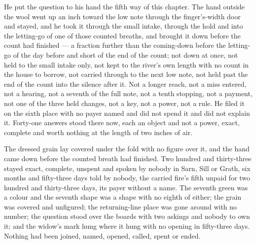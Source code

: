He put the question to his hand the fifth way of this chapter. The hand outside the wool went up an inch toward the low note through the finger's-width door and stayed, and he took it through the small intake, through the hold and into the letting-go of one of those counted breaths, and brought it down before the count had finished --- a fraction further than the coming-down before the letting-go of the day before and short of the end of the count; not down at once, not held to the small intake only, not kept to the river's own length with no count in the house to borrow, not carried through to the next low note, not held past the end of the count into the silence after it. Not a longer reach, not a miss entered, not a hearing, not a seventh of the full note, not a tenth stopping, not a payment, not one of the three held changes, not a key, not a power, not a rule. He filed it on the sixth place with no payer named and did not spend it and did not explain it. Forty-one answers stood there now, each an object and not a power, exact, complete and worth nothing at the length of two inches of air.

The dressed grain lay covered under the fold with no figure over it, and the hand came down before the counted breath had finished. Two hundred and thirty-three stayed exact, complete, unspent and spoken by nobody in Sarn, Sill or Grath, six months and fifty-three days told by nobody, the carried fire's fifth unpaid for two hundred and thirty-three days, its payer without a name. The seventh green was a colour and the seventh shape was a shape with no eighth of either; the grain was covered and unfigured; the returning-line place was gone around with no number; the question stood over the boards with two askings and nobody to own it; and the widow's mark hung where it hung with no opening in fifty-three days. Nothing had been joined, named, opened, called, spent or ended.
